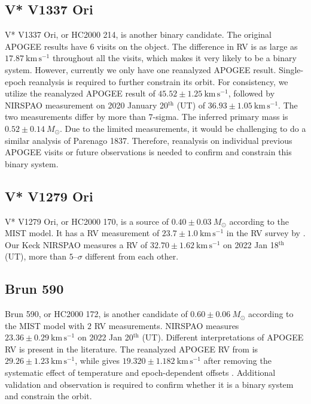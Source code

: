\documentclass[12pt]{ucsddissertation}
\begin{document}
\begin{CJK*}{UTF8}{gbsn}
\subsection{V* V1337 Ori}
\label{onc-subsec:V1337}
V* V1337 Ori, or HC2000 214, is another binary candidate. The original APOGEE results have $6$ visits on the object. The difference in RV is as large as $17.87~\mathrm{km}\,\mathrm{s}^{-1}$ throughout all the visits, which makes it very likely to be a binary system. However, currently we only have one reanalyzed APOGEE result. Single-epoch reanalysis is required to further constrain its orbit. For consistency, we utilize the reanalyzed APOGEE result of $45.52\pm1.25~\mathrm{km}\,\mathrm{s}^{-1}$, followed by NIRSPAO measurement on 2020 January 20$^\mathrm{th}$ (UT) of $36.93\pm1.05~\mathrm{km}\,\mathrm{s}^{-1}$. The two measurements differ by more than $7$-sigma. The inferred primary mass is $0.52\pm0.14~M_\odot$. Due to the limited measurements, it would be challenging to do a similar analysis of Parenago 1837. Therefore, reanalysis on individual previous APOGEE visits or future observations is needed to confirm and constrain this binary system.


\subsection{V* V1279 Ori}
V* V1279 Ori, or HC2000 170, is a source of $0.40\pm0.03~M_\odot$ according to the MIST model. It has a RV measurement of $23.7\pm1.0~\mathrm{km}\,\mathrm{s}^{-1}$ in the RV survey by \citet{Tobin-2009}. Our Keck NIRSPAO measures a RV of $32.70\pm1.62~\mathrm{km}\,\mathrm{s}^{-1}$ on 2022 Jan 18$^\mathrm{th}$ (UT), more than $5$--$\sigma$ different from each other.


\subsection{Brun 590}
Brun 590, or HC2000 172, is another candidate of $0.60\pm0.06~M_\odot$ according to the MIST model with $2$ RV measurements. 
NIRSPAO measures $23.36\pm0.29~\mathrm{km}\,\mathrm{s}^{-1}$ on 2022 Jan 20$^\mathrm{th}$ (UT). Different interpretations of APOGEE RV is present in the literature. The reanalyzed APOGEE RV from  is $29.26\pm1.23~\mathrm{km}\,\mathrm{s}^{-1}$, while \citet{Kounkel-2019} gives $19.320\pm1.182~\mathrm{km}\,\mathrm{s}^{-1}$ after removing the systematic effect of temperature and epoch-dependent offsets \citep[][]{Cottaar-2014}. Additional validation and observation is required to confirm whether it is a binary system and constrain the orbit.


\end{CJK*}
\end{document}
